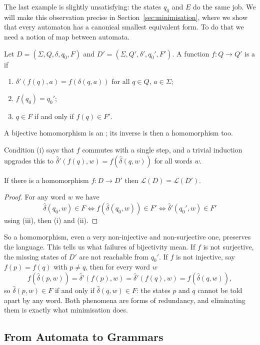 \documentclass[a4paper]{scrartcl}
\newcommand{\lang}{\mathcal{L}}
\begin{document}
The last example is slightly unsatisfying: the states $q_0$ and $E$ do the same job. We will make this observation precise in Section~\ref{sec:minimisation}, where we show that every automaton has a canonical smallest equivalent form. To do that we need a notion of map between automata.

\begin{definition}[Homomorphism]
	Let $D = (\Sigma, Q, \delta, q_0, F)$ and $D' = (\Sigma, Q', \delta', q_0', F')$. A function $f \colon Q \to Q'$ is a  if
	\begin{enumerate}[label=(\roman*)]
		\item $\delta'(f(q), a) = f(\delta(q,a))$ for all $q \in Q$, $a \in \Sigma$;
		\item $f(q_0) = q_0'$;
		\item $q \in F$ if and only if $f(q) \in F'$.
	\end{enumerate}
	A bijective homomorphism is an ; its inverse is then a homomorphism too.
\end{definition}

Condition (i) says that $f$ commutes with a single step, and a trivial induction upgrades this to $\hat\delta'(f(q), w) = f(\hat\delta(q,w))$ for all words $w$.

\begin{proposition}\label{prop:homlanguage}
	If there is a homomorphism $f \colon D \to D'$ then $\lang(D) = \lang(D')$.
\end{proposition}

\begin{proof}
	For any word $w$ we have
	$$\hat\delta(q_0, w) \in F \iff f(\hat\delta(q_0,w)) \in F' \iff \hat\delta'(q_0', w) \in F'$$
	using (iii), then (i) and (ii). \end{proof}

So a homomorphism, even a very non-injective and non-surjective one, preserves the language. This tells us what failures of bijectivity mean. If $f$ is not surjective, the missing states of $D'$ are not reachable from $q_0'$. If $f$ is not injective, say $f(p) = f(q)$ with $p \neq q$, then for every word $w$
$$f(\hat\delta(p,w)) = \hat\delta'(f(p),w) = \hat\delta'(f(q),w) = f(\hat\delta(q,w)),$$
so $\hat\delta(p,w) \in F$ if and only if $\hat\delta(q,w) \in F$: the states $p$ and $q$ cannot be told apart by any word. Both phenomena are forms of redundancy, and eliminating them is exactly what minimisation does.

\subsection{From Automata to Grammars}
\end{document}
